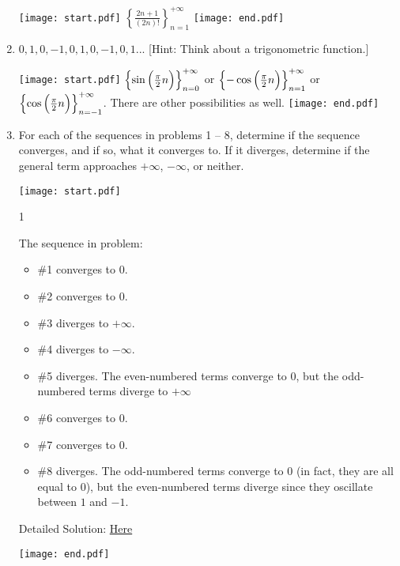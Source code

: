 \documentclass[12pt]{article}
\begin{document}
\begin{enumerate}
\texttt{[image: start.pdf]}
{{ $\left\{  \frac{2n+1}{(2n)!} \right\}_{n = 1}^{+\infty}$  }}
\texttt{[image: end.pdf]}


\item $0, 1, 0, -1, 0, 1, 0, -1, 0, 1 ...$ [Hint: Think about a trigonometric function.]

\texttt{[image: start.pdf]}
{{ $\left\{ \sin{  \Bigl( \frac{\pi}{2}}n \Bigr)  \right\}_{n = 0}^{+\infty}$ or  $\left\{ -\cos{  \Bigl( \frac{\pi}{2}}n \Bigr)  \right\}_{n = 1}^{+\infty}$ or
$\left\{ \cos{  \Bigl( \frac{\pi}{2}}n \Bigr)  \right\}_{n = -1}^{+\infty}$.  There are other possibilities as well.  }}
\texttt{[image: end.pdf]}


\item For each of the sequences in problems 1 -- 8, determine if the sequence converges, and if so, what it converges to.  If it diverges, determine if the general term approaches $+\infty$, $-\infty$, or neither.

\texttt{[image: start.pdf]}
{{{1\linewidth}
{The sequence in problem:
\begin{itemize} 
\item[] \#1 converges to 0.
\item[] \#2 converges to 0.
\item[] \#3 diverges to $+\infty$.
\item[] \#4 diverges to $-\infty$.
\item[] \#5 diverges.  The even-numbered terms converge to $0$, but the odd-numbered terms diverge to $+\infty$
\item[] \#6 converges to 0.
\item[] \#7 converges to 0.
\item[] \#8 diverges.  The odd-numbered terms converge to $0$ (in fact, they are all equal to $0$), but the even-numbered terms diverge since they oscillate between $1$ and $-1$. 
\end{itemize}
Detailed Solution: \textcolor{blue}{\href{http://www.math.drexel.edu/classes/Calculus/resources/Math123HW/Solutions/123_05_Sequences_09.pdf}{Here}}}}}
\texttt{[image: end.pdf]}


\end{enumerate}

 
\end{document}
